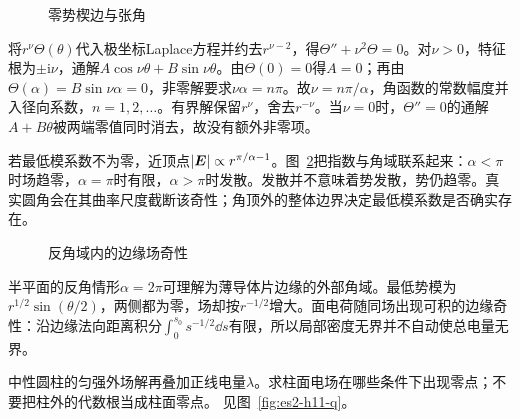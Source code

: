 \begin{figure}[H]\centering
{}
\caption{零势楔边与张角}\label{fig:es2-h10-q}
\end{figure}
\begin{solution}
将$r^\nu\Theta(\theta)$代入极坐标Laplace方程并约去$r^{\nu-2}$，得$\Theta''+\nu^2\Theta=0$。对$\nu>0$，特征根为$\pm\mathrm i\nu$，通解$A\cos\nu\theta+B\sin\nu\theta$。由$\Theta(0)=0$得$A=0$；再由$\Theta(\alpha)=B\sin\nu\alpha=0$，非零解要求$\nu\alpha=n\pi$。故$\nu=n\pi/\alpha$，角函数的常数幅度并入径向系数，$n=1,2,\ldots$。有界解保留$r^\nu$，舍去$r^{-\nu}$。当$\nu=0$时，$\Theta''=0$的通解$A+B\theta$被两端零值同时消去，故没有额外非零项。

若最低模系数不为零，近顶点$|\bm{E}|\propto r^{\pi/\alpha-1}$。图~\ref{fig:es2-h10-s}把指数与角域联系起来：$\alpha<\pi$时场趋零，$\alpha=\pi$时有限，$\alpha>\pi$时发散。发散并不意味着势发散，势仍趋零。真实圆角会在其曲率尺度截断该奇性；角顶外的整体边界决定最低模系数是否确实存在。
\begin{figure}[H]\centering
{}
\caption{反角域内的边缘场奇性}\label{fig:es2-h10-s}
\end{figure}


半平面的反角情形$\alpha=2\pi$可理解为薄导体片边缘的外部角域。最低势模为$r^{1/2}\sin(\theta/2)$，两侧都为零，场却按$r^{-1/2}$增大。面电荷随同场出现可积的边缘奇性：沿边缘法向距离积分$\int_0^{s_0}s^{-1/2}\dd s$有限，所以局部密度无界并不自动使总电量无界。
\end{solution}

\begin{exercise}[带净电量圆柱的零场位置]\label{ex:es2-h11}
中性圆柱的匀强外场解再叠加正线电量$\lambda$。求柱面电场在哪些条件下出现零点；不要把柱外的代数根当成柱面零点。 见图~\ref{fig:es2-h11-q}。
\end{exercise}

